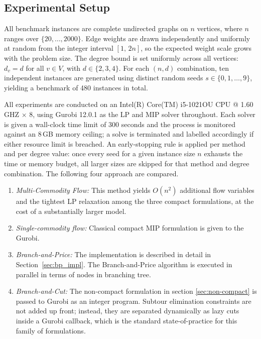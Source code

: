 \documentclass[12pt]{article}
\begin{document}
\subsection{Experimental Setup}

All benchmark instances are complete undirected graphs on $n$ vertices, where $n$ ranges over $\{20, \dots, 2000\}$.
Edge weights are drawn independently and uniformly at random from the integer interval $[1,\, 2n]$, so the expected weight scale grows with the problem size.
The degree bound is set uniformly across all vertices: $d_v = d$ for all $v \in V$, with $d \in \{2, 3, 4\}$.
For each $(n,d)$ combination, ten independent instances are generated using distinct random seeds $s \in \{0, 1, \ldots, 9\}$, yielding a benchmark of 480 instances in total.


\medskip
\noindent All experiments are conducted on an Intel(R) Core(TM) i5-1021OU CPU @ 1.60 GHZ $\times$ 8, using Gurobi 12.0.1 as the LP and MIP solver throughout.
Each solver is given a wall-clock time limit of 300 seconds and the process is monitored against an 8\,GB memory ceiling; a solve is terminated and labelled accordingly if either resource limit is breached.
An early-stopping rule is applied per method and per degree value: once every seed for a given instance size $n$ exhausts the time or memory budget, all larger sizes are skipped for that method and degree combination. The following four approach are compared.

\begin{enumerate}

  \item \textit{Multi-Commodity Flow:} This method yields $O(n^2)$ additional flow variables and the tightest LP relaxation among the three compact formulations, at the cost of a substantially larger model.
  
  \item \textit{Single-commodity flow:} Classical compact MIP formulation is given to the Gurobi.

  \item \textit{Branch-and-Price:} The implementation is described in detail in Section~\ref{sec:bp_impl}. The Branch-and-Price algorithm is executed in parallel in terms of nodes in branching tree.

    \item \textit{Branch-and-Cut:}  The non-compact formulation in section \ref{sec:non-compact} is passed to Gurobi as an integer program.  Subtour elimination constraints are not added up front; instead, they are separated dynamically as lazy cuts inside a Gurobi callback, which is the standard state-of-practice for this family of formulations.
\end{enumerate}
\end{document}
